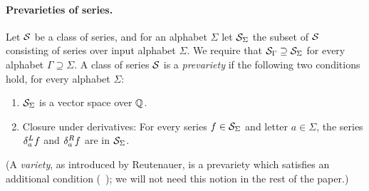 \paragraph{Prevarieties of series.}
%
Let $\mathcal S$ be a class of series,
and for an alphabet $\Sigma$ let $\mathcal S_\Sigma$ the subset of $\mathcal S$
consisting of series over input alphabet $\Sigma$. %
%
We require that $\mathcal S_\Gamma \supseteq \mathcal S_\Sigma$ for every alphabet $\Gamma \supseteq \Sigma$.
%
A class of series $\mathcal S$ is a \emph{prevariety} %
if the following two conditions hold, for every alphabet $\Sigma$:
%
\begin{enumerate}[label=\textbf{(V.\arabic*)}]
    
    \item \label{prevariety:A}
    $\mathcal S_\Sigma$ is a vector space over $\mathbb Q$.

    \item \label{prevariety:B}
    Closure under derivatives:
    For every series $f \in \mathcal S_\Sigma$ and letter $a \in \Sigma$,
    the series $\delta^L_{a} f$ and $\delta^R_{a} f$ are in $\mathcal S_\Sigma$.

\end{enumerate}
%
(A \emph{variety}, as introduced by Reutenauer,
is a prevariety which satisfies an additional condition (\cf~\cite[Sec.~III.1]{Reutenauer_1980});
we will not need this notion in the rest of the paper.)
